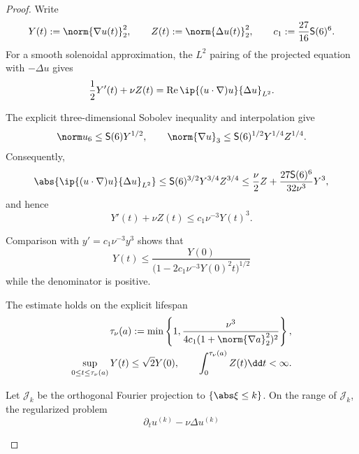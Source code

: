 \begin{proof}
Write
\[
 Y(t):=\norm{\nabla u(t)}_2^2,
 \qquad
 Z(t):=\norm{\Delta u(t)}_2^2,
 \qquad
 c_1:=\frac{27}{16}\mathsf S(6)^6.
\]
For a smooth solenoidal approximation, the \(L^2\) pairing of the projected
equation with \(-\Delta u\) gives
\begin{equation}
 \frac12Y'(t)+\nu Z(t)
 =\operatorname{Re}\ip{(u\cdot\nabla)u}{\Delta u}_{L^2}.
 \label{u:eq:qc-H1-energy-pairing}
\end{equation}
\begin{samepage}
The explicit three-dimensional Sobolev inequality and interpolation give
\[
 \norm u_6\le\mathsf S(6)Y^{1/2},
 \qquad
 \norm{\nabla u}_3
 \le\mathsf S(6)^{1/2}Y^{1/4}Z^{1/4}.
\]
Consequently,
\[
 \abs{\ip{(u\cdot\nabla)u}{\Delta u}_{L^2}}
 \le \mathsf S(6)^{3/2}Y^{3/4}Z^{3/4}
 \le\frac\nu2Z+\frac{27\mathsf S(6)^6}{32\nu^3}Y^3,
\]
and hence
\begin{equation}
 Y'(t)+\nu Z(t)\le c_1\nu^{-3}Y(t)^3.
 \label{u:eq:qc-H1-ode}
\end{equation}
\par
\end{samepage}
\begin{samepage}
Comparison with \(y'=c_1\nu^{-3}y^3\) shows that
\begin{equation}
 Y(t)\le
 \frac{Y(0)}{\bigl(1-2c_1\nu^{-3}Y(0)^2t\bigr)^{1/2}}
 \label{u:eq:qc-H1-local-explicit}
\end{equation}
while the denominator is positive.
\par
\end{samepage}
\begin{samepage}
The estimate holds on the explicit lifespan
\begin{equation}
 \begin{aligned}
 \tau_\nu(a):=
 \min\left\{1,
 \frac{\nu^3}{4c_1(1+\norm{\nabla a}_2^2)^2}
 \right\},\\
 \sup_{0\le t\le\tau_\nu(a)}Y(t)\le\sqrt2Y(0),
 \qquad
 \int_0^{\tau_\nu(a)}Z(t)\dd t<\infty.
 \end{aligned}
 \label{u:eq:qc-H1-local-lifespan}
\end{equation}
\par
\end{samepage}
\begin{samepage}
Let \(\mathcal J_k\) be the orthogonal Fourier projection to
\(\{\abs\xi\le k\}\).  On the range of \(\mathcal J_k\), the regularized
problem
\begin{equation}
 \partial_tu^{(k)}-\nu\Delta u^{(k)}

\end{equation}
\end{samepage}
\end{proof}
